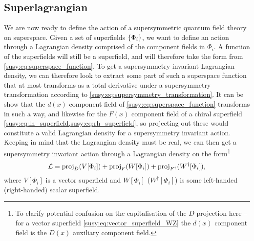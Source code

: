 \documentclass[../main.tex]{subfiles}
\begin{document}
\subsection{Superlagrangian}
We are now ready to define the action of a supersymmetric quantum field theory on superspace.
Given a set of superfields \(\left\{\Phi_i\right\}\), we want to define an action through a Lagrangian density comprised of the component fields in \(\Phi_i\).
A function of the superfields will still be a superfield, and will therefore take the form from \cref{susy:eq:superspace_function}.
To get a supersymmetry invariant Lagrangian density, we can therefore look to extract some part of such a superspace function that at most transforms as a total derivative under a supersymmetry transformation according to \cref{susy:eq:supersymmetry_transformation}.
It can be show that the \(d(x)\) component field of \cref{susy:eq:superspace_function} transforms in such a way, and likewise for the \(F(x)\) component field of a chiral superfield \cref{susy:eq:lh_superfield,susy:eq:rh_superfield}, so projecting out these would constitute a valid Lagrangian density for a supersymmetry invariant action.
Keeping in mind that the Lagrangian density must be real, we can then get a supersymmetry invariant action through a Lagrangian density on the form\footnote{To clarify potential confusion on the capitalisation of the \(D\)-projection here -- for a vector superfield \cref{susy:eq:vector_superfield_WZ} the \(d(x)\) component field is the \(D(x)\) auxiliary component field.}
\begin{align}
  \label{susy:eq:projection_lagragnian}
  \mathcal{L} = \operatorname{proj}_D (V[\Phi_i]) + \operatorname{proj}_F (W[\Phi_i]) + \operatorname{proj}_{F^\dagger}(W^\dagger[\Phi_i]),
\end{align}
where \(V[\Phi_i]\) is a vector superfield and \(W[\Phi_i]\) (\(W^\dagger[\Phi_i]\)) is some left-handed (right-handed) scalar superfield.
\end{document}
